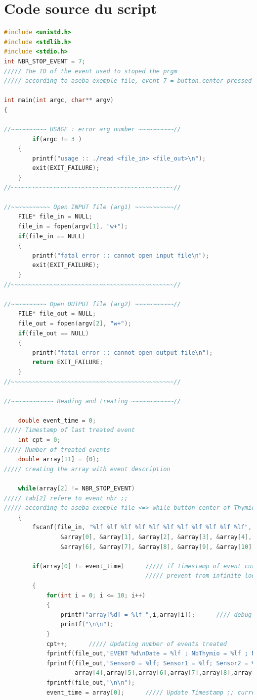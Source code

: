 \documentclass[a4paper, 12pt]{report}
\begin{document}
\section*{Code source du script}
\begin{lstlisting}[language=C]
#include <unistd.h>
#include <stdlib.h>
#include <stdio.h>
int NBR_STOP_EVENT = 7;
///// The ID of the event used to stoped the prgm
///// according to aseba exemple file, event 7 = button.center pressed

int main(int argc, char** argv)
{

//~~~~~~~~~~ USAGE : error arg number ~~~~~~~~~~//	
		if(argc != 3 )
	{
		printf("usage :: ./read <file_in> <file_out>\n");
		exit(EXIT_FAILURE);
	}
//~~~~~~~~~~~~~~~~~~~~~~~~~~~~~~~~~~~~~~~~~~~~~~//	

//~~~~~~~~~~~ Open INPUT file (arg1) ~~~~~~~~~~~//
	FILE* file_in = NULL;
	file_in = fopen(argv[1], "w+");
	if(file_in == NULL)
	{
		printf("fatal error :: cannot open input file\n");
		exit(EXIT_FAILURE);
	}
//~~~~~~~~~~~~~~~~~~~~~~~~~~~~~~~~~~~~~~~~~~~~~~//

//~~~~~~~~~~ Open OUTPUT file (arg2) ~~~~~~~~~~~//
	FILE* file_out = NULL;
	file_out = fopen(argv[2], "w+");
	if(file_out == NULL)
	{
		printf("fatal error :: cannot open output file\n");
		return EXIT_FAILURE;
	}
//~~~~~~~~~~~~~~~~~~~~~~~~~~~~~~~~~~~~~~~~~~~~~~//

//~~~~~~~~~~~~ Reading and treating ~~~~~~~~~~~~//
	
	double event_time = 0;
///// Timestamp of last treated event
	int cpt = 0;		
///// Number of treated events
	double array[11] = {0};	
///// creating the array with event description

	while(array[2] != NBR_STOP_EVENT)	
///// tab[2] refere to event nbr ;;
///// according to aseba exemple file <=> while button center of Thymio not pressed
	{
		fscanf(file_in, "%lf %lf %lf %lf %lf %lf %lf %lf %lf %lf %lf",	
				&array[0], &array[1], &array[2], &array[3], &array[4], &array[5], 
				&array[6], &array[7], &array[8], &array[9], &array[10]);
				
		if(array[0] != event_time)		///// if Timestamp of event currently scanned != Timestamp of previous event ;;	
										///// prevent from infinite loop treatment on the current event ;;
		{
			for(int i = 0; i <= 10; i++)
			{	
				printf("array[%d] = %lf ",i,array[i]);		//// debug help ;; disp the array for each new event treated
				printf("\n\n");
			}
			cpt++;		///// Updating number of events treated
			fprintf(file_out,"EVENT %d\nDate = %lf ; NbThymio = %lf ; NbEvent = %lf ; NbArgEvent = %lf\n",cpt,array[0],array[1],array[2],array[3]);		///// writing in the output file
			fprintf(file_out,"Sensor0 = %lf; Sensor1 = %lf; Sensor2 = %lf; Sensor3 = %lf; Sensor4 = %lf; Sensor5 = %lf; Sensor6 = %lf;\n",
					array[4],array[5],array[6],array[7],array[8],array[9],array[10]);		///// writing in the output file
			fprintf(file_out,"\n\n");
			event_time = array[0];		///// Update Timestamp ;; current event is treated so it will become the ancient one for next iteration
			

\end{lstlisting}
\end{document}
